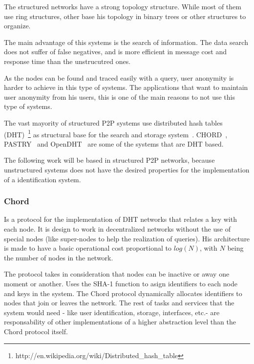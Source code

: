 The structured networks have a strong topology structure. While most of them
use ring structures, other base his topology in binary trees or other
structures to organize.

The main advantage of this systems is the search of information. The data search does not
suffer of false negatives, and is more efficient in message cost and response
time than the unstrucutred ones. 

As the nodes can be found and traced easily with a query, user anonymity is harder to
achieve in this type of systems.  The applications that want to maintain user
anonymity from his users, this is one of the main reasons to not use this type
of systems.

The vast mayority of structured P2P systems use distributed hash tables
(DHT)~\footnote{http://en.wikipedia.org/wiki/Distributed\_hash\_table} as
structural base for the search and storage system~\cite{BalakrishnanEtAl03}.
CHORD~\cite{conf:hotos:DabekBKKMSB01},
PASTRY~\cite{oai:CiteSeerPSU:441779} and 
OpenDHT~\cite{Rhea:2005:OPD:1080091.1080102}
are some of the systems that are DHT based.

The following work will be based in structured P2P networks, because unstructured
systems does not have the desired properties for the implementation of a
identification system. 

\subsubsection{Chord}
\label{sec:chord}

Is a protocol for the implementation of DHT networks that relates a key with
each node. It is design to work in decentralized networks without the use of
special nodes (like super-nodes to help the realization of queries). His
architecture is made to have a basic operational cost proportional to $log(N)$,
with $N$ being the number of nodes in the network.

The protocol takes in consideration that nodes can be inactive or away one
moment or another. Uses the SHA-1 function to asign identifiers to each node
and keys in the system. The Chord protocol dynamically allocates identifiers to nodes that
join or leaves the network. The rest of tasks and services that the system
would need - like user identification, storage, interfaces, etc.- are
responsability of other implementations of a higher abstraction level than the
Chord protocol itself.

